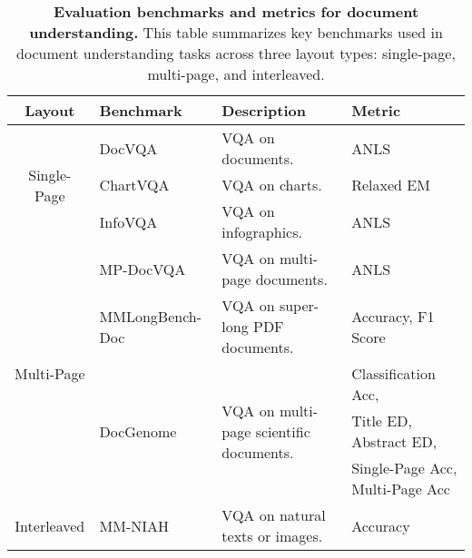 \begin{table*}[t]
\centering
\setlength\tabcolsep{4pt}
\begin{tabular}{c|l|l|l}
\toprule
Layout    & Benchmark       & Description                             & Metric                                                                                      \\
\midrule
\multirow{3}{*}{Single-Page} & DocVQA~\cite{mathew2021docvqa}          & VQA on documents.                       & ANLS                                          \\
                             & ChartVQA~\cite{masry2022chartqa}        & VQA on charts.                          & Relaxed EM                                    \\
                             & InfoVQA~\cite{mathew2022infographicvqa}         & VQA on infographics.                    & ANLS                                          \\
\midrule
\multirow{5}{*}{Multi-Page}  & MP-DocVQA~\cite{tito2023mpdocvqa}       & VQA on multi-page documents.            & ANLS                                          \\
                             & MMLongBench-Doc~\cite{ma2024mmlong} & VQA on super-long PDF documents.        & Accuracy, F1 Score                            \\
                             & \multirow{3}{*}[3ex]{DocGenome~\cite{xia2024docgenome}}  & \multirow{3}{*}[3ex]{VQA on multi-page scientific documents.} & Classification Acc, \\
                             &                                  &                                                          & Title ED, Abstract ED, \\
                             &                                  &                                                          & Single-Page Acc,   Multi-Page Acc \\
\midrule
Interleaved                  & MM-NIAH~\cite{wang2024mmniah}         & VQA on natural texts or images.         & Accuracy   \\ 
\bottomrule
\end{tabular}
\caption{\textbf{Evaluation benchmarks and metrics for document understanding.}
This table summarizes key benchmarks used in document understanding tasks across three layout types: single-page, multi-page, and interleaved. 
}
\label{tab:benchmark_metrics}
\end{table*}